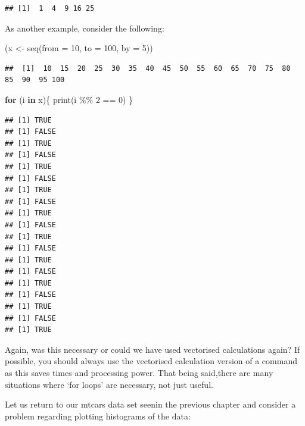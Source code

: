 \documentclass[
]{book}
\newenvironment{Shaded}{\begin{snugshade}}{\end{snugshade}}
\newcommand{\AttributeTok}[1]{\textcolor[rgb]{0.77,0.63,0.00}{#1}}
\newcommand{\ControlFlowTok}[1]{\textcolor[rgb]{0.13,0.29,0.53}{\textbf{#1}}}
\newcommand{\DecValTok}[1]{\textcolor[rgb]{0.00,0.00,0.81}{#1}}
\newcommand{\FunctionTok}[1]{\textcolor[rgb]{0.00,0.00,0.00}{#1}}
\newcommand{\NormalTok}[1]{#1}
\newcommand{\OtherTok}[1]{\textcolor[rgb]{0.56,0.35,0.01}{#1}}
\newcommand{\SpecialCharTok}[1]{\textcolor[rgb]{0.00,0.00,0.00}{#1}}
\theoremstyle{definition}
\theoremstyle{definition}
\theoremstyle{definition}
\theoremstyle{definition}
\theoremstyle{remark}
\begin{document}
\begin{verbatim}
## [1]  1  4  9 16 25
\end{verbatim}

As another example, consider the following:

\begin{Shaded}
\begin{Highlighting}[]
\NormalTok{(x }\OtherTok{\textless{}{-}} \FunctionTok{seq}\NormalTok{(}\AttributeTok{from =} \DecValTok{10}\NormalTok{, }\AttributeTok{to =} \DecValTok{100}\NormalTok{, }\AttributeTok{by =} \DecValTok{5}\NormalTok{))}
\end{Highlighting}
\end{Shaded}

\begin{verbatim}
##  [1]  10  15  20  25  30  35  40  45  50  55  60  65  70  75  80  85  90  95 100
\end{verbatim}

\begin{Shaded}
\begin{Highlighting}[]
\ControlFlowTok{for}\NormalTok{ (i }\ControlFlowTok{in}\NormalTok{ x)\{}
  \FunctionTok{print}\NormalTok{(i }\SpecialCharTok{\%\%} \DecValTok{2} \SpecialCharTok{==} \DecValTok{0}\NormalTok{)}
\NormalTok{\}}
\end{Highlighting}
\end{Shaded}

\begin{verbatim}
## [1] TRUE
## [1] FALSE
## [1] TRUE
## [1] FALSE
## [1] TRUE
## [1] FALSE
## [1] TRUE
## [1] FALSE
## [1] TRUE
## [1] FALSE
## [1] TRUE
## [1] FALSE
## [1] TRUE
## [1] FALSE
## [1] TRUE
## [1] FALSE
## [1] TRUE
## [1] FALSE
## [1] TRUE
\end{verbatim}

Again, was this necessary or could we have used vectorised calculations again? If possible, you should always use the vectorised calculation version of a command as this saves times and processing power. That being said,there are many situations where `for loops' are necessary, not just useful.

Let us return to our mtcars data set seenin the previous chapter and consider a problem regarding plotting histograms of the data:

\begin{Shaded}
\end{Shaded}
\end{document}
